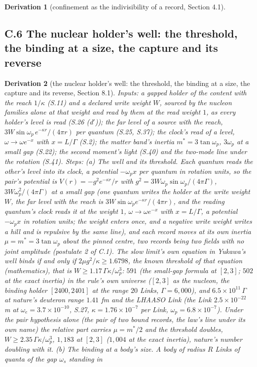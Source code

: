 \documentclass[pdflatex,sn-mathphys-num]{sn-jnl}
\theoremstyle{thmstyleone}
\newtheorem{derivation}{Derivation}
\renewcommand{\thederivation}{S.\arabic{derivation}}
\begin{document}
\begin{derivation}[confinement as the indivisibility of a record, Section 4.1]
\end{derivation}


\subsection*{C.6 The nuclear holder's well: the threshold, the binding at a size, the capture and its reverse}

\renewcommand{\thederivation}{C.\arabic{derivation}}\setcounter{derivation}{5}
\begin{derivation}[the nuclear holder's well: the threshold, the binding at a size, the capture and its reverse, Section 8.1]
\emph{Inputs:} a gapped holder of the content with the reach $1 / \kappa$ (S.11) and a declared write weight $W$, sourced by the nucleon families alone at that weight and read by them at the read weight $1$, as every holder's level is read (S.26 (d$'$)); the far level of a source with the reach, $3W\sin\omega_p\,e^{-\kappa r} / (4\pi r)$ per quantum (S.25, S.37); the clock's read of a level, $\omega \to \omega e^{-x}$ with $x = L / \Gamma$ (S.2); the matter band's inertia $m^* = 3\tan\omega_p$, $3\omega_p$ at a small gap (S.22); the second moment's light (S.40) and the two-mode line under the rotation (S.41). \emph{Steps:} (a) \emph{The well and its threshold.} Each quantum reads the other's level into its clock, a potential $-\omega_p x$ per quantum in rotation units, so the pair's potential is $V(r) = -g^2 e^{-\kappa r} / r$ with $g^2 = 3W\omega_p\sin\omega_p / (4\pi\Gamma)$, $3W\omega_p^2 / (4\pi\Gamma)$ at a small gap (one quantum writes the holder at the write weight $W$, the far level with the reach is $3W\sin\omega_p e^{-\kappa r} / (4\pi r)$, and the reading quantum's clock reads it at the weight $1$, $\omega \to \omega e^{-x}$ with $x = L / \Gamma$, a potential $-\omega_p x$ in rotation units; the weight enters once, and a negative write weight writes a hill and is repulsive by the same line), and each record moves at its own inertia $\mu = m^* = 3\tan\omega_p$ about the pinned centre, two records being two fields with no joint amplitude (postulate 2 of C.1). The slow limit's own equation in Yukawa's well binds if and only if $2\mu g^2 / \kappa \ge 1.6798$, the known threshold of that equation (mathematics), that is $W \ge 1.17\,\Gamma\kappa / \omega_p^3$: $591$ (the small-gap formula at $[2, 3]$; $502$ at the exact inertia) in the rule's own universe ($[2, 3]$ as the nucleon, the binding holder $[2400, 2401]$ at the range $20$ Links, $\Gamma = 6{,}000$), and $6.5 \times 10^{11}\,\Gamma$ at nature's deuteron range $1.41$ fm and the LHAASO Link (the Link $2.5 \times 10^{-22}$ m at $\omega_e = 3.7 \times 10^{-10}$, S.27, $\kappa = 1.76 \times 10^{-7}$ per Link, $\omega_p = 6.8 \times 10^{-7}$). Under the pair hypothesis alone (the pair of two bound records, the law's line under its own name) the relative part carries $\mu = m^* / 2$ and the threshold doubles, $W \ge 2.35\,\Gamma\kappa / \omega_p^3$, $1{,}183$ at $[2, 3]$ ($1{,}004$ at the exact inertia), nature's number doubling with it. (b) \emph{The binding at a body's size.} A body of radius $R$ Links of quanta of the gap $\omega_s$ standing in 
\end{derivation}
\end{document}
